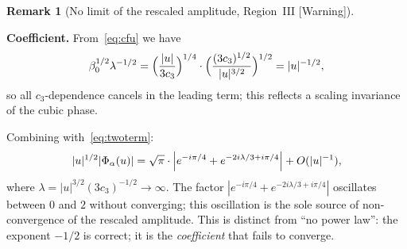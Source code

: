 \documentclass[12pt,a4paper]{amsart}
\theoremstyle{definition}
\newtheorem{remark}[theorem]{Remark}
\newcommand{\Warn}{\textup{[Warning]}}
\begin{document}
\begin{remark}[No limit of the rescaled amplitude,
  Region~III \Warn]
\label{rem:nolimit}

\noindent\textbf{Coefficient.}
From~\eqref{eq:cfu} we have
\[
  \beta_0^{1/2}\lambda^{-1/2}
  =
  \Bigl(\frac{|u|}{3c_3}\Bigr)^{1/4}
  \cdot
  \Bigl(\frac{(3c_3)^{1/2}}{|u|^{3/2}}\Bigr)^{1/2}
  =
  |u|^{-1/2},
\]
so all $c_3$-dependence cancels in the leading term;
this reflects a scaling invariance of the cubic phase.

\medskip
Combining with~\eqref{eq:twoterm}:
\begin{equation}\label{eq:rescaled}
  |u|^{1/2}|\Phi_\alpha(u)|
  = \sqrt{\pi}
  \cdot
  \Bigl|e^{-i\pi/4}
  +e^{-2i\lambda/3+i\pi/4}\Bigr|
  + O(|u|^{-1}),
\end{equation}
where $\lambda=|u|^{3/2}(3c_3)^{-1/2}\to\infty$.
The factor $|e^{-i\pi/4}+e^{-2i\lambda/3+i\pi/4}|$
oscillates between $0$ and $2$
without converging;
this oscillation is the sole source
of non-convergence of the rescaled amplitude.
This is distinct from
``no power law'': the exponent
$-1/2$ is correct;
it is the \emph{coefficient}
that fails to converge.
\end{remark}
\end{document}
